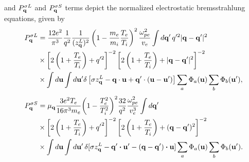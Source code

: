 \documentclass[12pt,a4paper,ruledheader]{report}
\begin{document}
and $P_{\bf q}^{\sigma L}$ and $P_{\bf q}^{\sigma S}$ terms depict the
normalized electrostatic bremsstrahlung equations, given by
\begin{equation}
  \begin{split}
    P_{\bf q}^{\sigma L}
  &= \frac{12e^2}{\pi^3}
    \frac{1}{q^2}\frac{1}{(z_{\bf q}^L)^2}
    \left(1-\frac{m_e}{m_i}\frac{T_e}{T_i}\right)^2
    \frac{\omega_{pe}^2}{v_e}
    \int d{\bf q'}\,q'^2|{\bf q-q'}|^2\\
  &\times \left[2\left(1+\frac{T_e}{T_i}\right)+q'^2\right]^{-2}
    \left[2\left(1+\frac{T_e}{T_i}\right) +|{\bf q-q'}|^2\right]^{-2}
    \label{PqL}\\
  &\times \int d{\bf u}\int d{\bf u'}
    \delta \left[ \sigma z_{\bf q}^L-{\bf q\cdot u}
    +{\bf q'}\cdot ({\bf u-u'})\right]
    \sum_a \Phi_a({\bf u})\sum_b \Phi_b({\bf u'}),
 \end{split}
\end{equation}
\begin{equation}
  \begin{split}
  P_{\bf q}^{\sigma S}
  &= \mu_{\bf q}\frac{3e^2T_e}{16\pi^3m_e}
    \biggl(1-\frac{T_e^2}{T_i^2}\biggr)^2
    \frac{32}{q^2}\frac{\omega_{pe}^2}{v_e^3}\int d{\bf q}'\\
  &\times\left[2
    \left(1+\frac{T_e}{T_i}\right)+{q'}^2\right]^{-2}
    \left[2 \left(1+\frac{T_e}{T_i}\right)
    +({\bf q}-{\bf q}')^2\right]^{-2}
    \label{PqS}\\
  &\times\int d{\bf u}\int d{\bf u}'\,
    \delta[\sigma z_{\bf q}^L-{\bf q}'\bm{\cdot}{\bf u}'
    -({\bf q}-{\bf q}') \bm {\cdot}{\bf u}]
    \sum_a\Phi_a({\bf u})\sum_b\Phi_b({\bf u}').
  \end{split}
\end{equation}
\end{document}
